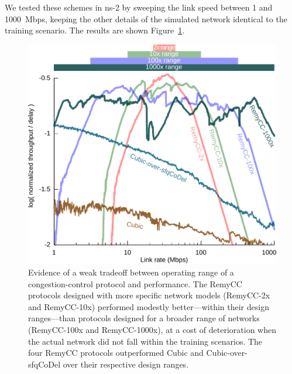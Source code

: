 We tested these schemes in ns-2 by sweeping the link speed between 1
and 1000~Mbps, keeping the other details of the simulated network
identical to the training scenario. The results are shown Figure~\ref{fig:breadth}.

\begin{figure}
\caption{Evidence of a weak tradeoff between operating range of a
  congestion-control protocol and performance. The RemyCC protocols
  designed with more specific network models (RemyCC-2x and RemyCC-10x)
  performed modestly better---within their design ranges---than protocols
  designed for a broader range of networks (RemyCC-100x and RemyCC-1000x),
  at a cost of deterioration when the actual network did not fall
  within the training scenarios. The four RemyCC protocols outperformed
  Cubic and Cubic-over-sfqCoDel over their respective design ranges.}
\label{fig:breadth}
\begin{center}
\includegraphics[width=\columnwidth]{oprange-manual.pdf}
\end{center}
\end{figure}

